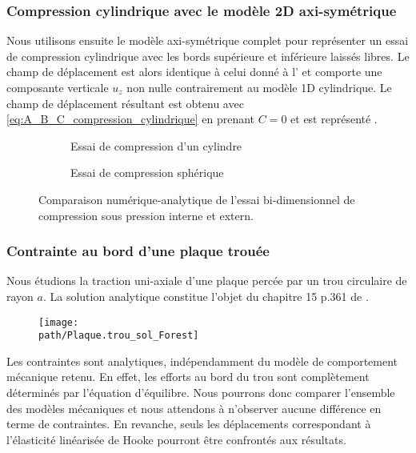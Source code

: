 \documentclass[10pt]{book}
\def\path{./fig}
\begin{document}
\subsubsection{Compression cylindrique avec le modèle 2D axi-symétrique}
Nous utilisons ensuite le modèle axi-symétrique complet pour représenter un essai de compression cylindrique avec les bords supérieure et inférieure laissés libres. Le champ de déplacement est alors identique à celui donné à l' et comporte une composante verticale $u_{z}$ non nulle contrairement au modèle 1D cylindrique. Le champ de déplacement résultant est obtenu avec \eqref{eq:A_B_C_compression_cylindrique} en prenant $C=0$ et est représenté .
\begin{figure}[h!]
\begin{subfigure}[b]{0.49\textwidth}
\caption{Essai de compression d'un cylindre}
\label{fig:2D_Cylindric_compression}
\end{subfigure}
\begin{subfigure}[b]{0.49\textwidth}
\caption{Essai de compression sphérique}
\end{subfigure}
\caption{Comparaison numérique-analytique de l'essai bi-dimensionnel de compression sous pression interne et extern.}
\label{fig:2D_Cylindric_compression}
\end{figure}
\subsubsection{Contrainte au bord d'une plaque trouée}
Nous étudions la traction uni-axiale d'une plaque percée par un trou circulaire de rayon $a$. La solution analytique constitue l'objet du chapitre 15 p.361 de \cite{forest2015mecanique}.
\begin{figure}[h!]
\centering \texttt{[image: \\path/Plaque.trou\_sol\_Forest]}
\end{figure}
Les contraintes sont analytiques, indépendamment du modèle de comportement mécanique retenu. En effet, les efforts au bord du trou sont complètement déterminés par l'équation d'équilibre. Nous pourrons donc comparer l'ensemble des modèles mécaniques et nous attendons à n'observer aucune différence en terme de contraintes. En revanche, seuls les déplacements correspondant à l'élasticité linéarisée de Hooke pourront être confrontés aux résultats.
\end{document}
